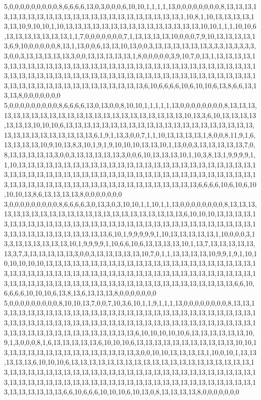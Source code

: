 5,0,0,0,0,0,0,0,0,0,8,6,6,6,6,13,0,3,0,0,0,6,10,10,1,1,1,1,13,0,0,0,0,0,0,0,0,8,13,13,13,13,13,13,13,13,13,13,13,13,13,13,13,13,13,13,13,13,13,13,13,1,10,8,1,10,13,13,13,13,13,13,10,9,10,10,1,10,13,13,13,13,13,13,13,13,13,13,13,13,13,13,13,10,10,1,1,1,10,10,6,13,13,13,13,13,13,13,1,1,7,0,0,0,0,0,0,0,7,1,13,13,13,13,10,0,0,0,7,9,10,13,13,13,13,13,6,9,10,0,0,0,0,0,8,13,1,13,0,0,6,13,13,10,13,0,0,3,13,13,13,13,13,13,3,3,3,13,3,3,3,3,3,0,0,3,13,13,13,13,13,3,0,0,13,13,13,13,13,1,8,0,0,0,0,0,3,9,10,7,0,13,1,13,13,13,13,13,13,13,13,13,13,13,13,13,13,13,13,13,13,13,13,13,13,13,13,13,13,13,13,13,13,13,13,13,13,13,13,13,13,13,13,13,13,13,13,13,13,13,13,13,13,13,13,13,13,13,13,13,13,13,13,13,13,13,13,13,13,13,13,13,13,13,13,13,13,13,13,6,10,6,6,6,6,10,6,10,10,6,13,8,6,6,13,13,13,8,0,0,0,0,0,0,0
5,0,0,0,0,0,0,0,0,0,8,6,6,6,6,13,0,13,0,0,8,10,10,1,1,1,1,1,13,0,0,0,0,0,0,0,0,8,13,13,13,13,13,13,13,13,13,13,13,13,13,13,13,13,13,13,13,13,13,13,13,10,13,3,6,10,13,13,13,13,13,13,13,10,10,10,6,13,13,13,13,13,13,13,13,13,13,13,13,13,13,13,13,13,13,13,13,13,13,13,13,13,13,13,13,13,13,13,6,1,9,1,13,3,0,0,7,1,1,10,13,13,13,13,1,8,0,0,8,11,9,1,6,13,13,13,13,10,9,10,13,8,3,10,1,9,1,9,10,10,10,13,13,10,1,13,0,0,3,13,13,13,13,13,7,0,8,13,13,13,13,13,3,0,0,3,13,13,13,13,13,3,0,0,6,10,13,13,13,10,1,10,3,8,13,1,9,9,9,9,1,1,10,13,13,13,13,13,13,13,13,13,13,13,13,13,13,13,13,13,13,13,13,13,13,13,13,13,13,13,13,13,13,13,13,13,13,13,13,13,13,13,13,13,13,13,13,13,13,13,13,13,13,13,13,13,13,13,13,13,13,13,13,13,13,13,13,13,13,13,13,13,13,13,13,13,13,13,13,6,6,6,6,10,6,10,6,10,10,10,13,8,6,13,13,13,13,8,0,0,0,0,0,0,0
3,0,0,0,0,0,0,0,0,0,8,6,6,6,6,3,0,13,3,0,3,10,10,1,1,10,1,1,13,0,0,0,0,0,0,0,0,8,13,13,13,13,13,13,13,13,13,13,13,13,13,13,13,13,13,13,13,13,13,13,13,6,10,10,10,13,13,13,13,13,13,13,13,13,13,13,13,13,13,13,13,13,13,13,13,13,13,13,13,13,13,13,13,13,13,13,13,13,13,13,13,13,13,13,13,13,13,13,13,6,10,1,9,9,9,9,9,1,10,13,13,13,13,13,1,10,0,0,0,3,13,3,13,13,13,13,13,13,10,1,9,9,9,9,1,10,6,6,10,6,13,13,13,13,10,1,13,7,13,13,13,13,13,13,3,7,3,13,13,13,13,13,3,0,0,3,13,13,13,13,13,10,7,0,1,1,13,13,13,13,10,9,9,1,9,1,10,10,10,10,10,10,13,13,13,13,13,13,13,13,13,13,13,13,13,13,13,13,13,13,13,13,13,13,13,13,13,13,13,13,13,13,13,13,13,13,13,13,13,13,13,13,13,13,13,13,13,13,13,13,13,13,13,13,13,13,13,13,13,13,13,13,13,13,13,13,13,13,13,13,13,13,13,13,13,13,13,13,13,6,6,10,6,6,6,6,10,10,10,6,13,8,13,6,13,13,13,8,0,0,0,0,0,0,0
5,0,0,0,0,0,0,0,0,0,8,10,10,13,7,0,0,7,10,3,6,10,1,1,9,1,1,1,13,0,0,0,0,0,0,0,0,8,13,13,13,13,13,13,13,13,13,13,13,13,13,13,13,13,13,13,13,13,13,13,13,13,13,13,13,13,13,13,13,13,13,13,13,13,13,13,13,13,13,13,13,13,13,13,13,13,13,13,13,13,13,13,13,13,13,13,13,13,13,13,13,13,13,13,13,13,13,13,13,13,13,6,10,10,10,10,10,6,13,13,13,13,13,13,10,9,1,3,0,0,0,8,1,6,13,13,13,13,13,6,10,10,10,6,13,13,13,13,13,13,13,13,13,13,13,10,10,13,13,13,13,13,13,13,13,13,13,13,13,13,13,13,3,0,0,10,10,13,13,13,13,1,10,0,10,1,13,13,13,13,13,6,10,10,10,6,13,13,13,13,13,13,13,13,13,13,13,13,13,13,13,13,13,13,13,13,13,13,13,13,13,13,13,13,13,13,13,13,13,13,13,13,13,13,13,13,13,13,13,13,13,13,13,13,13,13,13,13,13,13,13,13,13,13,13,13,13,13,13,13,13,13,13,13,13,13,13,13,13,13,13,13,13,13,13,13,13,13,13,6,6,10,6,6,6,10,10,10,6,10,13,0,8,13,13,13,13,8,0,0,0,0,0,0,0
